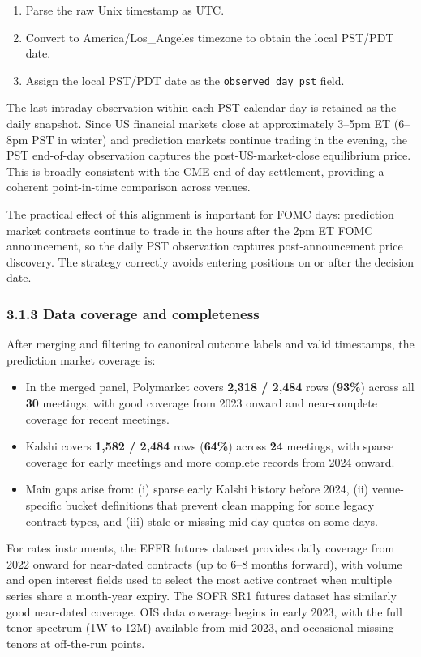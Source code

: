 \begin{enumerate}
    \item Parse the raw Unix timestamp as UTC.
    \item Convert to America/Los\_Angeles timezone to obtain the local PST/PDT date.
    \item Assign the local PST/PDT date as the \texttt{observed\_day\_pst} field.
\end{enumerate}

The last intraday observation within each PST calendar day is retained as the daily snapshot. Since US financial markets close at approximately 3--5pm ET (6--8pm PST in winter) and prediction markets continue trading in the evening, the PST end-of-day observation captures the post-US-market-close equilibrium price. This is broadly consistent with the CME end-of-day settlement, providing a coherent point-in-time comparison across venues.

The practical effect of this alignment is important for FOMC days: prediction market contracts continue to trade in the hours after the 2pm ET FOMC announcement, so the daily PST observation captures post-announcement price discovery. The strategy correctly avoids entering positions on or after the decision date.

\subsubsection*{3.1.3 Data coverage and completeness}

After merging and filtering to canonical outcome labels and valid timestamps, the prediction market coverage is:
\begin{itemize}
    \item In the merged panel, Polymarket covers \textbf{2,318 / 2,484} rows (\textbf{93\%}) across all \textbf{30} meetings, with good coverage from 2023 onward and near-complete coverage for recent meetings.
    \item Kalshi covers \textbf{1,582 / 2,484} rows (\textbf{64\%}) across \textbf{24} meetings, with sparse coverage for early meetings and more complete records from 2024 onward.
    \item Main gaps arise from: (i) sparse early Kalshi history before 2024, (ii) venue-specific bucket definitions that prevent clean mapping for some legacy contract types, and (iii) stale or missing mid-day quotes on some days.
\end{itemize}

For rates instruments, the EFFR futures dataset provides daily coverage from 2022 onward for near-dated contracts (up to 6--8 months forward), with volume and open interest fields used to select the most active contract when multiple series share a month-year expiry. The SOFR SR1 futures dataset has similarly good near-dated coverage. OIS data coverage begins in early 2023, with the full tenor spectrum (1W to 12M) available from mid-2023, and occasional missing tenors at off-the-run points.


